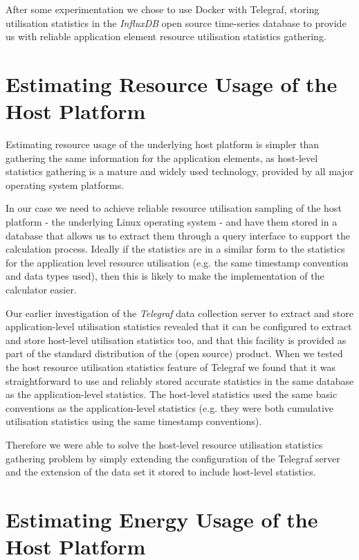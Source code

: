 After some experimentation we chose to use Docker with Telegraf, storing utilisation statistics in the \emph{InfluxDB} \cite{influxdb2018} open source time-series database to provide us with reliable application element resource utilisation statistics gathering.

\section{Estimating Resource Usage of the Host Platform}

Estimating resource usage of the underlying host platform is simpler than gathering the same information for the application elements, as host-level statistics gathering is a mature and widely used technology, provided by all major operating system platforms.

In our case we need to achieve reliable resource utilisation sampling of the host platform - the underlying Linux operating system - and have them stored in a database that allows us to extract them through a query interface to support the calculation process.  Ideally if the statistics are in a similar form to the statistics for the application level resource utilisation (e.g. the same timestamp convention and data types used), then this is likely to make the implementation of the calculator easier.

Our earlier investigation of the \emph{Telegraf} data collection server to extract and store application-level utilisation statistics revealed that it can be configured to extract and store host-level utilisation statistics too, and that this facility is provided as part of the standard distribution of the (open source) product.  When we tested the host resource utilisation statistics feature of Telegraf we found that it was straightforward to use and reliably stored accurate statistics in the same database as the application-level statistics.  The host-level statistics used the same basic conventions as the application-level statistics (e.g. they were both cumulative utilisation statistics using the same timestamp conventions).

Therefore we were able to solve the host-level resource utilisation statistics gathering problem by simply extending the configuration of the Telegraf server and the extension of the data set it stored to include host-level statistics.

\section{Estimating Energy Usage of the Host Platform}

